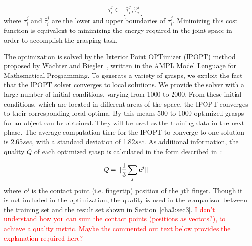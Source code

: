 \begin{equation}
 {\tau}^j_i \in [\bar{\tau}^j_i, \hat{\tau}^j_i]
 \label{quality}
\end{equation}
where $\bar{\tau}^j_i$ and $\hat{\tau}^j_i$ are the lower and upper boundaries of $\tau^j_i$.
Minimizing this cost function is equivalent to minimizing the energy required in the joint space in order to accomplish the grasping task.

The optimization is solved by the Interior Point OPTimizer (IPOPT) method proposed by W\"{a}chter and Biegler~\citep{wachter2006implementation}, written in the AMPL Model Language for Mathematical Programming. To generate a variety of grasps, we exploit the fact that the IPOPT solver converges to local solutions. We provide the solver with a large number of initial conditions, varying from 1000 to 2000. From these initial conditions, which are located in different areas of the space, the IPOPT converges to their corresponding local optima. By this means 500 to 1000 optimized grasps for an object can be obtained. They will be used as the training data in the next phase. The average computation time for the IPOPT to converge to one solution is 2.65$sec$, with a standard deviation of 1.82$sec$. As additional information, the quality $Q$ of each optimized grasp is calculated in the form described in~\citep{ponce1997computing}:

\begin{equation}
Q =\Arrowvert \frac{1}{3}\sum_{j} {\boldsymbol{c}^j}\Arrowvert
\vspace{-0.1in}
\end{equation}
where \textbf{\emph{c}}$^j$ is the contact point (i.e. fingertip) position of the $j$th finger. Though it is not included in the optimization, the quality is used in the comparison between the training set and the result set shown in Section~\ref{cha3:sec3}.
\textcolor{red}{I don't understand how you can sum the contact points (positions as vectors?), to achieve a quality metric. Maybe the commented out text below provides the explanation required here?}


